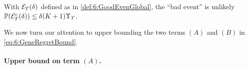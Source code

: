 \begin{lemma}\label{lem:6:GoodEventGlobal}
\begin{leftbar}[lemmabar]  %
    With $\mathcal{E}_T(\delta)$ defined as in \eqref{def:6:GoodEvenGlobal}, the ``bad event'' is unlikely
        $\mathbb{P}(\mathcal{E}_T^c(\delta)) \leq \delta(K+1)\Upsilon_T$.
\end{leftbar}  %
\end{lemma}

We now turn our attention to upper bounding the two terms $(A)$ and $(B)$ in \eqref{eq:6:GeneRegretBound}.



\paragraph{Upper bound on term $(A)$.}

